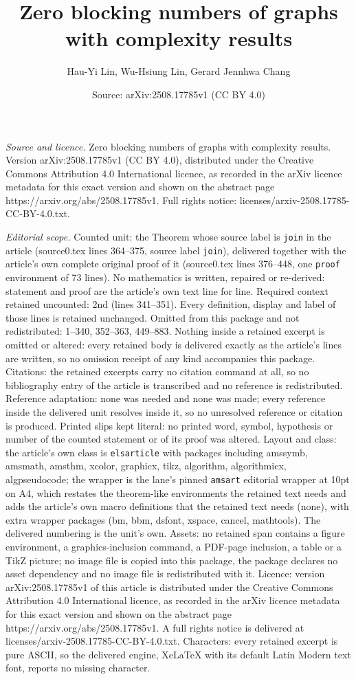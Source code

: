 \documentclass[10pt,a4paper]{amsart}
\title[Zero blocking numbers of graphs with complexity results]{Zero blocking numbers of graphs with complexity results}
\author{Hau-Yi Lin, Wu-Hsiung Lin, Gerard Jennhwa Chang}
\date{Source: arXiv:2508.17785v1 (CC BY 4.0)}
\begin{document}
\maketitle

\noindent\emph{Source and licence.} Zero blocking numbers of graphs with complexity results. Version arXiv:2508.17785v1 (CC BY 4.0), distributed under the Creative Commons Attribution 4.0 International licence, as recorded in the arXiv licence metadata for this exact version and shown on the abstract page https://arxiv.org/abs/2508.17785v1. Full rights notice: licenses/arxiv-2508.17785-CC-BY-4.0.txt.\par\smallskip

\noindent\textit{Editorial scope.} Counted unit: the Theorem whose source label is \texttt{join} in the article (source0.tex lines 364--375, source label \texttt{join}), delivered together with the article's own complete original proof of it (source0.tex lines 376--448, one \texttt{proof} environment of 73 lines). No mathematics is written, repaired or re-derived: statement and proof are the article's own text line for line. Required context retained uncounted: 2nd (lines 341--351). Every definition, display and label of those lines is retained unchanged. Omitted from this package and not redistributed: 1--340, 352--363, 449--883. Nothing inside a retained excerpt is omitted or altered: every retained body is delivered exactly as the article's lines are written, so no omission receipt of any kind accompanies this package. Citations: the retained excerpts carry no citation command at all, so no bibliography entry of the article is transcribed and no reference is redistributed. Reference adaptation: none was needed and none was made; every reference inside the delivered unit resolves inside it, so no unresolved reference or citation is produced. Printed slips kept literal: no printed word, symbol, hypothesis or number of the counted statement or of its proof was altered. Layout and class: the article's own class is \texttt{elsarticle} with packages including amssymb, amsmath, amsthm, xcolor, graphicx, tikz, algorithm, algorithmicx, algpseudocode; the wrapper is the lane's pinned \texttt{amsart} editorial wrapper at 10pt on A4, which restates the theorem-like environments the retained text needs and adds the article's own macro definitions that the retained text needs (none), with extra wrapper packages (bm, bbm, dsfont, xspace, cancel, mathtools). The delivered numbering is the unit's own. Assets: no retained span contains a figure environment, a graphics-inclusion command, a PDF-page inclusion, a table or a TikZ picture; no image file is copied into this package, the package declares no asset dependency and no image file is redistributed with it. Licence: version arXiv:2508.17785v1 of this article is distributed under the Creative Commons Attribution 4.0 International licence, as recorded in the arXiv licence metadata for this exact version and shown on the abstract page https://arxiv.org/abs/2508.17785v1. A full rights notice is delivered at licenses/arxiv-2508.17785-CC-BY-4.0.txt. Characters: every retained excerpt is pure ASCII, so the delivered engine, XeLaTeX with its default Latin Modern text font, reports no missing character.
\end{document}
